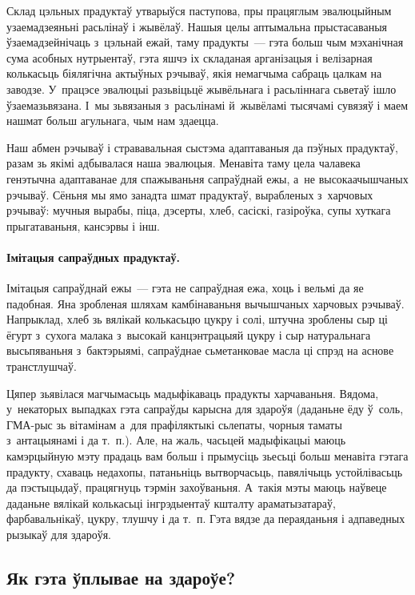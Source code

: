 Склад цэльных прадуктаў утварыўся паступова, пры працяглым эвалюцыйным узаемадзеяньні расьлінаў і жывёлаў. Нашыя целы аптымальна прыстасаваныя ўзаемадзейнічаць з~цэльнай ежай, таму прадукты~--- гэта больш чым мэханічная сума асобных нутрыентаў, гэта яшчэ іх складаная арганізацыя і велізарная колькасьць біялягічна актыўных рэчываў, якія немагчыма сабраць цалкам на заводзе. У~працэсе эвалюцыі разьвіцьцё жывёльнага і расьліннага сьветаў ішло ўзаемазьвязана. І~мы зьвязаныя з~расьлінамі й~жывёламі тысячамі сувязяў і маем нашмат больш агульнага, чым нам здаецца.

Наш абмен рэчываў і стрававальная сыстэма адаптаваныя да пэўных прадуктаў, разам зь якімі адбывалася наша эвалюцыя. Менавіта таму цела чалавека генэтычна адаптаванае для спажываньня сапраўднай ежы, а~не высокаачышчаных рэчываў. Сёньня мы ямо занадта шмат прадуктаў, вырабленых з~харчовых рэчываў: мучныя вырабы, піца, дэсерты, хлеб, сасіскі, газіроўка, супы хуткага прыгатаваньня, кансэрвы і інш.

\paragraph{Імітацыя сапраўдных прадуктаў.}
Імітацыя сапраўднай ежы~--- гэта не сапраўдная ежа, хоць і вельмі да яе падобная. Яна зробленая шляхам камбінаваньня вычышчаных харчовых рэчываў. Напрыклад, хлеб зь вялікай колькасьцю цукру і солі, штучна зроблены сыр ці ёгурт з~сухога малака з~высокай канцэнтрацыяй цукру і сыр натуральнага высьпяваньня з~бактэрыямі, сапраўднае сьметанковае масла ці спрэд на аснове транстлушчаў.

Цяпер зьявілася магчымасьць мадыфікаваць прадукты харчаваньня. Вядома, у~некаторых выпадках гэта сапраўды карысна для здароўя (даданьне ёду ў~соль, ГМА-рыс зь вітамінам а~для прафіляктыкі сьлепаты, чорныя таматы з~антацыянамі і да т.~п.). Але, на жаль, часьцей мадыфікацыі маюць камэрцыйную мэту прадаць вам больш і прымусіць зьесьці больш менавіта гэтага прадукту, схаваць недахопы, патаньніць вытворчасьць, павялічыць устойлівасьць да пэстыцыдаў, працягнуць тэрмін захоўваньня. А~такія мэты маюць наўвеце даданьне вялікай колькасьці інгрэдыентаў кшталту араматызатараў, фарбавальнікаў, цукру, тлушчу і да т.~п. Гэта вядзе да пераяданьня і адпаведных рызыкаў для здароўя.

\subsection{Як гэта ўплывае на здароўе?}

